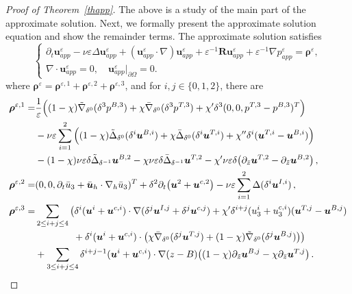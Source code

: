 \documentclass[pdflatex,sn-mathphys-num]{sn-jnl}%
\theoremstyle{thmstyleone}%
\theoremstyle{thmstyletwo}%
\theoremstyle{thmstylethree}%
\theoremstyle{thmstyletwo}
\begin{document}
\begin{proof}[Proof of Theorem~{\upshape\ref{thapp}}]
The above is a study of the main part of the approximate solution.
Next, we formally present the approximate solution equation and show the remainder terms. The approximate solution satisfies
\begin{equation}\label{2.61}
	\begin{cases}
		\partial_{t} {\boldsymbol u}_{app}^{\varepsilon}-\nu\varepsilon\Delta{\boldsymbol u}_{app}^{\varepsilon}+({\boldsymbol u}_{app}^{\varepsilon} \cdot \nabla) {\boldsymbol u}_{app}^{\varepsilon}+\varepsilon^{-1}\boldsymbol{R} {\boldsymbol u}_{app}^{\varepsilon}
		+\varepsilon^{-1}\nabla{p}_{app}^{\varepsilon}=\boldsymbol \rho^{\varepsilon},\\
		\nabla\cdot {\boldsymbol u}_{app}^{\varepsilon}=0,\quad
		{\boldsymbol u}_{app}^{\varepsilon}|_{\partial\Omega}=0.
	\end{cases}
\end{equation}
where $\boldsymbol{\rho}^\varepsilon=\boldsymbol \rho^{\varepsilon,1}+\boldsymbol \rho^{\varepsilon,2}+\boldsymbol \rho^{\varepsilon,3}$, and for $i,j\in\{0,1,2\}$, there are
\begin{align}
	\boldsymbol{\rho}^{\varepsilon,1}=
	&
	\frac{1}{\varepsilon}\Big(
	(1-\chi)\tilde{\nabla}_{\delta^0}
	(\delta^3p^{B,3})
	+\chi\bar{\nabla}_{\delta^0}(\delta^3p^{T,3})
	+\chi'\delta^3(0,0,p^{T,3}-p^{B,3})^T\Big)
	\notag\\
	&-\nu\varepsilon\sum_{i=1}^2
	\Big(
	(1-\chi)
	\tilde{\Delta}_{\delta^{0}}(\delta^i\boldsymbol{u}^{B,i})
	+\chi
	\bar{\Delta}_{\delta^0}(\delta^i\boldsymbol{u}^{T,i})
	+\chi''\delta^i(\boldsymbol{u}^{T,i}-\boldsymbol{u}^{B,i})
	\Big)
	\notag\\
	&-(1-\chi)\nu\varepsilon\delta\tilde{\Delta}_{\delta^{-1}}\boldsymbol u^{B,2}
	-\chi\nu\varepsilon\delta\bar{\Delta}_{\delta^{-1}}\boldsymbol u^{T,2}
	-\chi'\nu\varepsilon\delta
	\big(
	\partial_{\bar{z}}\boldsymbol{u}^{T,2}
	-\partial_{\tilde{z}}\boldsymbol{u}^{B,2}
	\big)\,,\label{rho1}\\
	\boldsymbol{\rho}^{\varepsilon,2}=
	&
	(0,0,\partial_t \bar{u}_3+\bar{\boldsymbol{u}}_h\cdot\nabla_{h}\bar{u}_3)^T
	+\delta^2\partial_t\big(\boldsymbol{u}^{2}+\boldsymbol{u}^{c,2}\big) -\nu\varepsilon\sum\limits_{i=1}^2
	\Delta(\delta^i\boldsymbol{u}^{I,i})\,,
	\label{rho2}\\
	\boldsymbol{\rho}^{\varepsilon,3}=
	&\sum_{2\leq i+j\leq4} 
	\big(
	\delta^i(\boldsymbol{u}^{i}+\boldsymbol{u}^{c,i})\cdot\nabla (\delta^j\boldsymbol{u}^{I,j}+\delta^j\boldsymbol{u}^{c,j})
	+\chi'\delta^{i+j}
	({u}_3^{i}+{u}_3^{c,i})
	(\boldsymbol{u}^{T,j}-\boldsymbol{u}^{B,j})
	\notag\\
	&\qquad\qquad
	+\delta^{i}
	(\boldsymbol{u}^{i}+\boldsymbol{u}^{c,i})
	\cdot
	\big(
	\chi\bar{\nabla}_{\delta^{0}}(\delta^j\boldsymbol{u}^{T,j})
	+(1-\chi)
	\tilde{\nabla}_{\delta^{0}}(\delta^j\boldsymbol{u}^{B,j})
	\big)
	\big)
	\notag\\
	&+\sum\limits_{3\leq i+j\leq4}\delta^{i+j-1}
	(\boldsymbol{u}^{i}+\boldsymbol{u}^{c,i})
	\cdot\nabla(z-B)
	\big(
	(1-\chi)\partial_{\tilde{z}}\boldsymbol{u}^{B,j}-\chi\partial_{\bar{z}}\boldsymbol{u}^{T,j}
	\big)\,.
	\label{rho3}
\end{align}





\end{proof}
\end{document}
